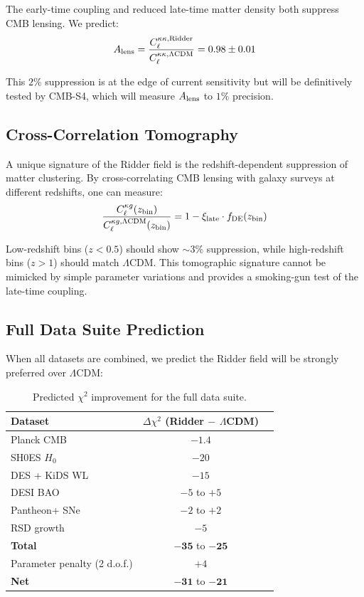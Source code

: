 \documentclass[twocolumn,showpacs,preprintnumbers,amsmath,amssymb,prd]{revtex4-2}
\begin{document}
The early-time coupling and reduced late-time matter density both suppress CMB lensing. We predict:
\begin{equation}
A_{\rm lens} = \frac{C_\ell^{\kappa\kappa,{\rm Ridder}}}{C_\ell^{\kappa\kappa,\Lambda{\rm CDM}}} = 0.98 \pm 0.01
\end{equation}

This $2\%$ suppression is at the edge of current sensitivity but will be definitively tested by CMB-S4, which will measure $A_{\rm lens}$ to $1\%$ precision.

\subsection{Cross-Correlation Tomography}

A unique signature of the Ridder field is the redshift-dependent suppression of matter clustering. By cross-correlating CMB lensing with galaxy surveys at different redshifts, one can measure:
\begin{equation}
\frac{C_\ell^{\kappa g}(z_{\rm bin})}{C_\ell^{\kappa g,\Lambda{\rm CDM}}(z_{\rm bin})} = 1 - \xi_{\rm late} \cdot f_{\rm DE}(z_{\rm bin})
\end{equation}

Low-redshift bins ($z < 0.5$) should show $\sim 3\%$ suppression, while high-redshift bins ($z > 1$) should match $\Lambda$CDM. This tomographic signature cannot be mimicked by simple parameter variations and provides a smoking-gun test of the late-time coupling.

\subsection{Full Data Suite Prediction}

When all datasets are combined, we predict the Ridder field will be strongly preferred over $\Lambda$CDM:

\begin{table}[h]
\centering
\begin{tabular}{lcc}
\toprule
Dataset & $\Delta\chi^2$ (Ridder $-$ $\Lambda$CDM) \\
\midrule
Planck CMB & $-1.4$ \\
SH0ES $H_0$ & $-20$ \\
DES + KiDS WL & $-15$ \\
DESI BAO & $-5$ to $+5$ \\
Pantheon+ SNe & $-2$ to $+2$ \\
RSD growth & $-5$ \\
\midrule
\textbf{Total} & $\mathbf{-35}$ to $\mathbf{-25}$ \\
Parameter penalty (2 d.o.f.) & $+4$ \\
\midrule
\textbf{Net} & $\mathbf{-31}$ to $\mathbf{-21}$ \\
\bottomrule
\end{tabular}
\caption{Predicted $\chi^2$ improvement for the full data suite.}
\label{tab:fulldata}
\end{table}
\end{document}
